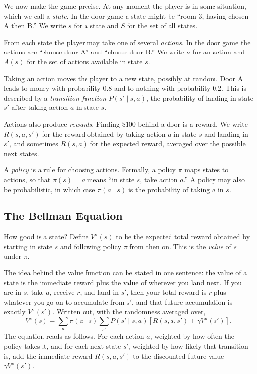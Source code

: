 \documentclass[11pt]{book}
\begin{document}
We now make the game precise. At any moment the player is in some situation, which we call a \emph{state}. In the door game a state might be ``room 3, having chosen A then B.'' We write $s$ for a state and $S$ for the set of all states.

From each state the player may take one of several \emph{actions}. In the door game the actions are ``choose door A'' and ``choose door B.'' We write $a$ for an action and $A(s)$ for the set of actions available in state $s$.

Taking an action moves the player to a new state, possibly at random. Door A leads to money with probability 0.8 and to nothing with probability 0.2. This is described by a \emph{transition function} $P(s' \mid s, a)$, the probability of landing in state $s'$ after taking action $a$ in state $s$.

Actions also produce \emph{rewards}. Finding \$100 behind a door is a reward. We write $R(s, a, s')$ for the reward obtained by taking action $a$ in state $s$ and landing in $s'$, and sometimes $R(s, a)$ for the expected reward, averaged over the possible next states.

A \emph{policy} is a rule for choosing actions. Formally, a policy $\pi$ maps states to actions, so that $\pi(s) = a$ means ``in state $s$, take action $a$.'' A policy may also be probabilistic, in which case $\pi(a \mid s)$ is the probability of taking $a$ in $s$.

\subsection{The Bellman Equation}

How good is a state? Define $V^\pi(s)$ to be the expected total reward obtained by starting in state $s$ and following policy $\pi$ from then on. This is the \emph{value} of $s$ under $\pi$.

The idea behind the value function can be stated in one sentence: the value of a state is the immediate reward plus the value of wherever you land next. If you are in $s$, take $a$, receive $r$, and land in $s'$, then your total reward is $r$ plus whatever you go on to accumulate from $s'$, and that future accumulation is exactly $V^\pi(s')$. Written out, with the randomness averaged over,
\[
V^\pi(s) = \sum_{a} \pi(a \mid s) \sum_{s'} P(s' \mid s,a) \left[ R(s,a,s') + \gamma V^\pi(s') \right].
\]
The equation reads as follows. For each action $a$, weighted by how often the policy takes it, and for each next state $s'$, weighted by how likely that transition is, add the immediate reward $R(s,a,s')$ to the discounted future value $\gamma V^\pi(s')$.
\end{document}
